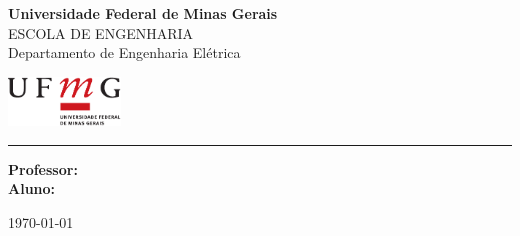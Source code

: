 \thispagestyle{empty}
\addtocounter{page}{-1}
\noindent
\begin{minipage}{0.8\linewidth}
  {\Large\bf Universidade Federal de Minas Gerais}\\
  {\small ESCOLA DE ENGENHARIA}\\
  {\sc Departamento de Engenharia Elétrica}
\end{minipage} 
\hfill 
\begin{minipage}{3cm}
  \includegraphics[width=3cm]{res/ufmg_ext.pdf}
\end{minipage}

\vspace{1mm}

\noindent
\hrule

\vspace{2.0cm}

\vfill

\begin{center}
  \Large \textsc{\textbf{\titleLa}}
\end{center}

\vfill

\begin{center}
  \Large\textsc{\textbf{\titleLb}}
\end{center}

\vfill

\begin{flushright}
    \begin{minipage}{12.0cm}
        {\bf Professor:} \nomeProfessor \\
        {\bf Aluno:} \nomeAluno     
    \end{minipage}
\end{flushright}

\vfill

\begin{center}
  \today
\end{center}

\vfill

\newpage